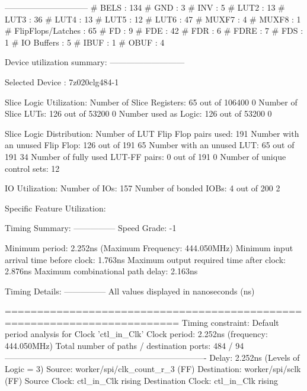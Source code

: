 \documentclass{article}
\begin{document}
------------------------------
# BELS                             : 134
#      GND                         : 3
#      INV                         : 5
#      LUT2                        : 13
#      LUT3                        : 36
#      LUT4                        : 13
#      LUT5                        : 12
#      LUT6                        : 47
#      MUXF7                       : 4
#      MUXF8                       : 1
# FlipFlops/Latches                : 65
#      FD                          : 9
#      FDE                         : 42
#      FDR                         : 6
#      FDRE                        : 7
#      FDS                         : 1
# IO Buffers                       : 5
#      IBUF                        : 1
#      OBUF                        : 4

Device utilization summary:
---------------------------

Selected Device : 7z020clg484-1 


Slice Logic Utilization: 
 Number of Slice Registers:              65  out of  106400     0%
 Number of Slice LUTs:                  126  out of  53200     0%
    Number used as Logic:               126  out of  53200     0%

Slice Logic Distribution: 
 Number of LUT Flip Flop pairs used:    191
   Number with an unused Flip Flop:     126  out of    191    65%
   Number with an unused LUT:            65  out of    191    34%
   Number of fully used LUT-FF pairs:     0  out of    191     0%
   Number of unique control sets:        12

IO Utilization: 
 Number of IOs:                         157
 Number of bonded IOBs:                   4  out of    200     2%

Specific Feature Utilization:

\fi
\iffalse
Timing Summary:
---------------
Speed Grade: -1

   Minimum period: 2.252ns (Maximum Frequency: 444.050MHz)
   Minimum input arrival time before clock: 1.763ns
   Maximum output required time after clock: 2.876ns
   Maximum combinational path delay: 2.163ns

Timing Details:
---------------
All values displayed in nanoseconds (ns)

=========================================================================
Timing constraint: Default period analysis for Clock 'ctl_in_Clk'
  Clock period: 2.252ns (frequency: 444.050MHz)
  Total number of paths / destination ports: 484 / 94
-------------------------------------------------------------------------
Delay:               2.252ns (Levels of Logic = 3)
  Source:            worker/spi/clk_count_r_3 (FF)
  Destination:       worker/spi/sclk (FF)
  Source Clock:      ctl_in_Clk rising
  Destination Clock: ctl_in_Clk rising
\end{document}
